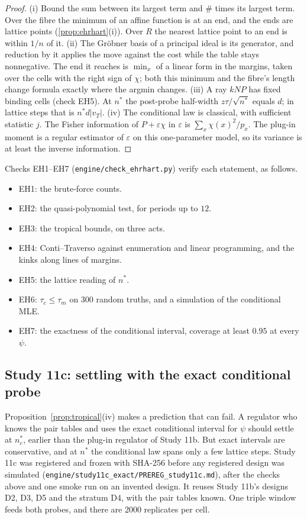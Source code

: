 \begin{proof}
(i) Bound the sum between its largest term and $\#$ times its largest term. Over the fibre the minimum of an affine function is at an
end, and the ends are lattice points (\cref{prop:ehrhart}(i)). Over $R$ the nearest lattice point to an end is within $1/n$ of it.
(ii) The Gr\"obner basis of a principal ideal is its generator, and reduction by it applies the move against the cost while the table
stays nonnegative. The end it reaches is $\min_x$ of a linear form in the margins, taken over the cells with the right sign of $\chi$;
both this minimum and the fibre's length change formula exactly where the argmin changes. (iii) A ray $kNP$ has fixed binding cells
(check EH5). At $n^*$ the post-probe half-width $z\tau/\sqrt{n^*}$ equals $d$; in lattice steps that is $n^*d|v_T|$. (iv) The
conditional law is classical, with sufficient statistic $j$. The Fisher information of $P+\varepsilon\chi$ in $\varepsilon$ is
$\sum_x\chi(x)^2/p_x$. The plug-in moment is a regular estimator of $\varepsilon$ on this one-parameter model, so its variance is at least
the inverse information.
\end{proof}

Checks EH1--EH7 (\texttt{engine/check\_ehrhart.py}) verify each statement, as follows.
\begin{itemize}
\item EH1: the brute-force counts.
\item EH2: the quasi-polynomial test, for periods up to $12$.
\item EH3: the tropical bounds, on three acts.
\item EH4: Conti--Traverso against enumeration and linear programming, and the kinks along lines of margins.
\item EH5: the lattice reading of $n^*$.
\item EH6: $\tau_c\le\tau_m$ on 300 random truths, and a simulation of the conditional MLE.
\item EH7: the exactness of the conditional interval, coverage at least $0.95$ at every $\psi$.
\end{itemize}

\subsection*{Study 11c: settling with the exact conditional probe}
Proposition~\ref{prop:tropical}(iv) makes a prediction that can fail. A regulator who knows the pair tables and uses the exact
conditional interval for $\psi$ should settle at $n^*_c$, earlier than the plug-in regulator of Study 11b. But exact intervals are
conservative, and at $n^*$ the conditional law spans only a few lattice steps. Study 11c was registered and frozen with SHA-256 before
any registered design was simulated (\texttt{engine/study11c\_exact/PREREG\_study11c.md}), after the checks above and one smoke run on an
invented design. It reuses Study 11b's designs D2, D3, D5 and the stratum D4, with the pair tables known. One triple window feeds both
probes, and there are 2000 replicates per cell.

